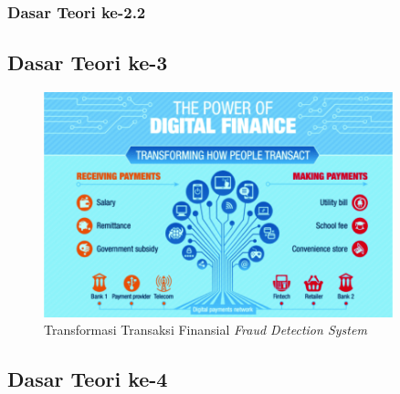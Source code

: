 \blindtext

\subsubsection{Dasar Teori ke-2.2}

\blindtext

\subsection{Dasar Teori ke-3}

\blindtext

\vspace{10pt}

\begin{figure}[h]
    \centering
    \includegraphics[width=0.90\textwidth]{src/resources/chapter-2-power-digital-finance.png}
    \caption{Transformasi Transaksi Finansial \textit{Fraud Detection System} \citep{8776857}}
    \label{fig:digital-finance}
\end{figure}

\vspace{10pt}

\subsection{Dasar Teori ke-4}

\blindtext

\blindtext
